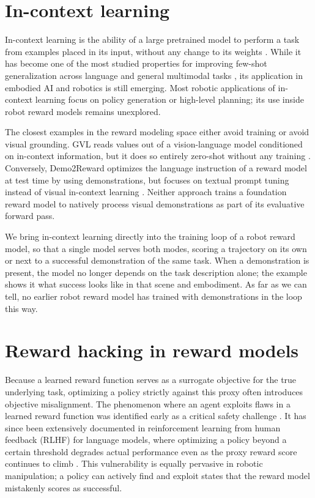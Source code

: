 \section{In-context learning}

In-context learning is the ability of a large pretrained model to perform a task from examples placed in its input, without any change to its weights \citep{brown_language_2020}. While it has become one of the most studied properties for improving few-shot generalization across language and general multimodal tasks \citep{dong_survey_2024, wang_qwen2-vl_2024}, its application in embodied AI and robotics is still emerging. Most robotic applications of in-context learning focus on policy generation or high-level planning; its use inside robot reward models remains unexplored.

The closest examples in the reward modeling space either avoid training or avoid visual grounding. GVL reads values out of a vision-language model conditioned on in-context information, but it does so entirely zero-shot without any training \citep{ma_vision_2025}. Conversely, Demo2Reward optimizes the language instruction of a reward model at test time by using demonstrations, but focuses on textual prompt tuning instead of visual in-context learning \citep{gumbsch_demonstrations_2026}. Neither approach trains a foundation reward model to natively process visual demonstrations as part of its evaluative forward pass.

We bring in-context learning directly into the training loop of a robot reward model, so that a single model serves both modes, scoring a trajectory on its own or next to a successful demonstration of the same task. When a demonstration is present, the model no longer depends on the task description alone; the example shows it what success looks like in that scene and embodiment. As far as we can tell, no earlier robot reward model has trained with demonstrations in the loop this way.

\section{Reward hacking in reward models}
\label{sec:reward-hacking}

Because a learned reward function serves as a surrogate objective for the true underlying task, optimizing a policy strictly against this proxy often introduces objective misalignment. The phenomenon where an agent exploits flaws in a learned reward function was identified early as a critical safety challenge \citep{amodei_concrete_2016}. It has since been extensively documented in reinforcement learning from human feedback (RLHF) for language models, where optimizing a policy beyond a certain threshold degrades actual performance even as the proxy reward score continues to climb \citep{gao_scaling_2023}. This vulnerability is equally pervasive in robotic manipulation; a policy can actively find and exploit states that the reward model mistakenly scores as successful.

